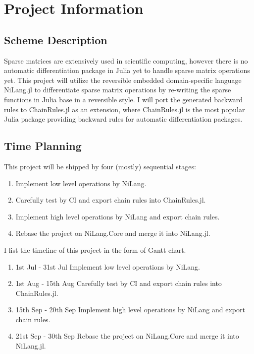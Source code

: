 

\section{Project Information}
\subsection{Scheme Description}
Sparse matrices are extensively used in scientific computing, however there is no automatic differentiation package in Julia yet to handle sparse matrix operations yet. This project will utilize the reversible embedded domain-specific language NiLang.jl to differentiate sparse matrix operations by re-writing the sparse functions in Julia base in a reversible style. I will port the generated backward rules to ChainRules.jl as an extension, where ChainRules.jl is the most popular Julia package providing backward rules for automatic differentiation packages. 
\subsection{Time Planning}

This project will be shipped by four (mostly) sequential stages:
\begin{enumerate}[(1)]
    \item Implement low level operations by NiLang.
    \item Carefully test by CI and export chain rules into ChainRules.jl. 
    \item Implement high level operations by NiLang and export chain rules.
    \item Rebase the project on NiLang.Core and merge it into NiLang.jl.
\end{enumerate}

I list the timeline of this project in the form of Gantt chart.
\begin{enumerate}[(1)]
    \item 1st Jul - 31st Jul \quad Implement low level operations by NiLang. 
    \item 1st Aug - 15th Aug   \quad Carefully test by CI and export chain rules into ChainRules.jl.
    \item 15th Sep - 20th Sep \quad  Implement high level operations by NiLang and export chain rules. 
    \item 21st Sep - 30th Sep \quad Rebase the project on NiLang.Core and merge it into NiLang.jl.
\end{enumerate}
\vspace{0.5cm}

